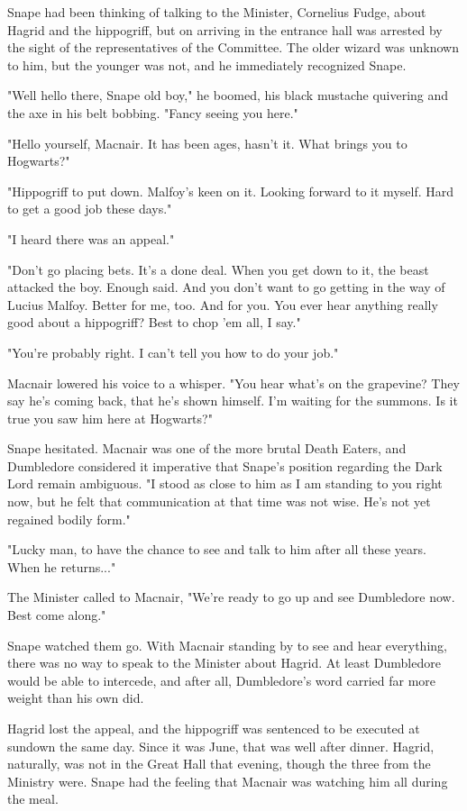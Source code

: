 \documentclass[a4paper,11pt]{article}
\begin{document}
Snape had been thinking of talking to the Minister, Cornelius Fudge, about Hagrid and the hippogriff, but on arriving in the entrance hall was arrested by the sight of the representatives of the Committee. The older wizard was unknown to him, but the younger was not, and he immediately recognized Snape.

"Well hello there, Snape old boy," he boomed, his black mustache quivering and the axe in his belt bobbing. "Fancy seeing you here."

"Hello yourself, Macnair. It has been ages, hasn't it. What brings you to Hogwarts?"

"Hippogriff to put down. Malfoy's keen on it. Looking forward to it myself. Hard to get a good job these days."

"I heard there was an appeal."

"Don't go placing bets. It's a done deal. When you get down to it, the beast attacked the boy. Enough said. And you don't want to go getting in the way of Lucius Malfoy. Better for me, too. And for you. You ever hear anything really good about a hippogriff? Best to chop 'em all, I say."

"You're probably right. I can't tell you how to do your job."

Macnair lowered his voice to a whisper. "You hear what's on the grapevine? They say he's coming back, that he's shown himself. I'm waiting for the summons. Is it true you saw him here at Hogwarts?"

Snape hesitated. Macnair was one of the more brutal Death Eaters, and Dumbledore considered it imperative that Snape's position regarding the Dark Lord remain ambiguous. "I stood as close to him as I am standing to you right now, but he felt that communication at that time was not wise. He's not yet regained bodily form."

"Lucky man, to have the chance to see and talk to him after all these years. When he returns..."

The Minister called to Macnair, "We're ready to go up and see Dumbledore now. Best come along."

Snape watched them go. With Macnair standing by to see and hear everything, there was no way to speak to the Minister about Hagrid. At least Dumbledore would be able to intercede, and after all, Dumbledore's word carried far more weight than his own did.

Hagrid lost the appeal, and the hippogriff was sentenced to be executed at sundown the same day. Since it was June, that was well after dinner. Hagrid, naturally, was not in the Great Hall that evening, though the three from the Ministry were. Snape had the feeling that Macnair was watching him all during the meal.
\end{document}
